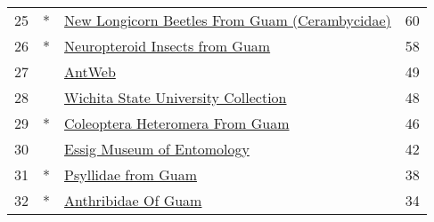 \begin{longtable}{llp{5in}r}
25 &  * &                                                                                                                                                   \href{https://www.gbif.org/dataset/7f2d2fe5-8875-4048-9191-b6ef16320fdb}{New Longicorn Beetles From Guam (Cerambycidae)} &            60 \\
26 &  * &                                                                                                                                                                   \href{https://www.gbif.org/dataset/592c9898-f961-4f9b-a833-5de174eb834b}{Neuropteroid Insects from Guam} &            58 \\
27 &    &                                                                                                                                                                                           \href{https://www.gbif.org/dataset/13b70480-bd69-11dd-b15f-b8a03c50a862}{AntWeb} &            49 \\
28 &    &                                                                                                                                                              \href{https://www.gbif.org/dataset/06448b27-4c5c-4296-8ece-a87e124c4f4e}{Wichita State University Collection} &            48 \\
29 &  * &                                                                                                                                                                  \href{https://www.gbif.org/dataset/7700299b-eb39-4c24-86fe-2eabb15beda7}{Coleoptera Heteromera From Guam} &            46 \\
30 &    &                                                                                                                                                                       \href{https://www.gbif.org/dataset/5d283bb6-64dd-4626-8b3b-a4e8db5415c3}{Essig Museum of Entomology} &            42 \\
31 &  * &                                                                                                                                                                              \href{https://www.gbif.org/dataset/204ef7e8-5ba9-4591-8275-598a53611feb}{Psyllidae from Guam} &            38 \\
32 &  * &                                                                                                                                                                              \href{https://www.gbif.org/dataset/0f4ee0b0-7d0e-443c-b4c9-0b40ecd08854}{Anthribidae Of Guam} &            34 \\

\end{longtable}
